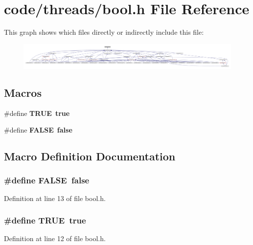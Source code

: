 \section{code/threads/bool.h File Reference}
\label{bool_8h}
This graph shows which files directly or indirectly include this file\+:
\nopagebreak
\begin{figure}[H]
\begin{center}
\leavevmode
\includegraphics[width=350pt]{bool_8h__dep__incl}
\end{center}
\end{figure}
\subsection*{Macros}
\begin{DoxyCompactItemize}
\item 
\#define {\bf T\+R\+UE}~{\bf true}
\item 
\#define {\bf F\+A\+L\+SE}~{\bf false}
\end{DoxyCompactItemize}


\subsection{Macro Definition Documentation}
\subsubsection[{F\+A\+L\+SE}]{\setlength{\rightskip}{0pt plus 5cm}\#define F\+A\+L\+SE~{\bf false}}\label{bool_8h_aa93f0eb578d23995850d61f7d61c55c1}


Definition at line 13 of file bool.\+h.

\subsubsection[{T\+R\+UE}]{\setlength{\rightskip}{0pt plus 5cm}\#define T\+R\+UE~{\bf true}}\label{bool_8h_aa8cecfc5c5c054d2875c03e77b7be15d}


Definition at line 12 of file bool.\+h.


